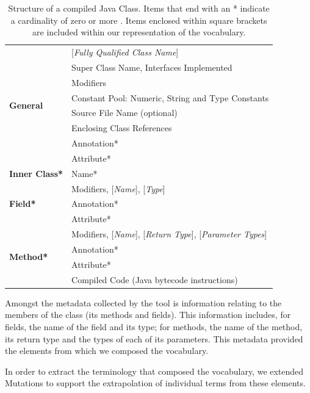 \begin{table}[t]
\centering
\begin{tabular}{|l|p{}|}
	\hline
\multirow{8}{*}{\textbf{General}} & [\emph{Fully Qualified Class Name}] \\
 & Super Class Name, Interfaces Implemented \\
 & Modifiers \\ 
 & Constant Pool: Numeric, String and Type Constants\\
 & Source File Name (optional)\\
 & Enclosing Class References\\
 & Annotation*\\
 & Attribute*\\ \hline
 \textbf{Inner Class*} & Name* \\ \hline
\multirow{3}{*}{\textbf{Field*}} & Modifiers, [\emph{Name}], [\emph{Type}] \\ 
& Annotation* \\
& Attribute* \\ \hline
\multirow{4}{*}{\textbf{Method*}} & Modifiers, [\emph{Name}], [\emph{Return Type}], [\emph{Parameter Types}] \\ 
& Annotation* \\ 
& Attribute* \\ 
& Compiled Code (Java bytecode instructions) \\ \hline
\end{tabular}
\vspace{0.2cm}
\caption{Structure of a compiled Java Class. Items that end with an * indicate a cardinality of zero or more \cite{Lindholm99a}. Items enclosed within square brackets are included within our representation of the vocabulary.}
\vspace{0.5cm}
\label{tab:class_structure}
\end{table}

Amongst the metadata collected by the tool is information relating to the members of the class (\ie its methods and fields). This information includes, for fields, the name of the field and its type; for methods, the name of the method, its return type and the types of each of its parameters. This metadata provided the elements from which we composed the vocabulary.

In order to extract the terminology that composed the vocabulary, we extended Mutations to support the extrapolation of individual terms from these elements.


